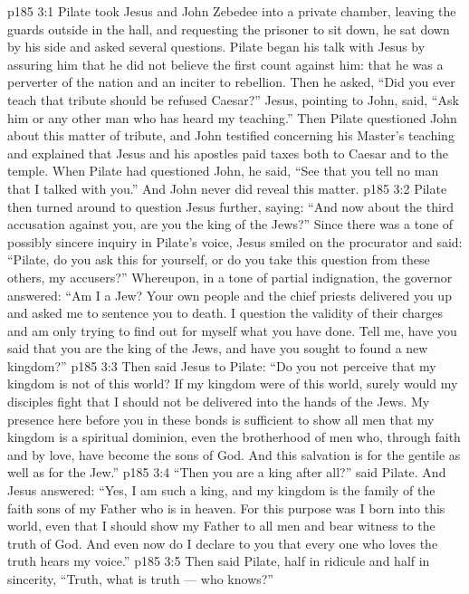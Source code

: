 \vs p185 3:1 Pilate took Jesus and John Zebedee into a private chamber, leaving the guards outside in the hall, and requesting the prisoner to sit down, he sat down by his side and asked several questions. Pilate began his talk with Jesus by assuring him that he did not believe the first count against him: that he was a perverter of the nation and an inciter to rebellion. Then he asked, “Did you ever teach that tribute should be refused Caesar?” Jesus, pointing to John, said, \textcolor{ubdarkred}{“Ask him or any other man who has heard my teaching.”} Then Pilate questioned John about this matter of tribute, and John testified concerning his Master’s teaching and explained that Jesus and his apostles paid taxes both to Caesar and to the temple. When Pilate had questioned John, he said, “See that you tell no man that I talked with you.” And John never did reveal this matter.
\vs p185 3:2 Pilate then turned around to question Jesus further, saying: “And now about the third accusation against you, are you the king of the Jews?” Since there was a tone of possibly sincere inquiry in Pilate’s voice, Jesus smiled on the procurator and said: \textcolor{ubdarkred}{“Pilate, do you ask this for yourself, or do you take this question from these others, my accusers?”} Whereupon, in a tone of partial indignation, the governor answered: “Am I a Jew? Your own people and the chief priests delivered you up and asked me to sentence you to death. I question the validity of their charges and am only trying to find out for myself what you have done. Tell me, have you said that you are the king of the Jews, and have you sought to found a new kingdom?”
\vs p185 3:3 Then said Jesus to Pilate: \textcolor{ubdarkred}{“Do you not perceive that my kingdom is not of this world? If my kingdom were of this world, surely would my disciples fight that I should not be delivered into the hands of the Jews. My presence here before you in these bonds is sufficient to show all men that my kingdom is a spiritual dominion, even the brotherhood of men who, through faith and by love, have become the sons of God. And this salvation is for the gentile as well as for the Jew.”}
\vs p185 3:4 “Then you are a king after all?” said Pilate. And Jesus answered: \textcolor{ubdarkred}{“Yes, I am such a king, and my kingdom is the family of the faith sons of my Father who is in heaven. For this purpose was I born into this world, even that I should show my Father to all men and bear witness to the truth of God. And even now do I declare to you that every one who loves the truth hears my voice.”}
\vs p185 3:5 Then said Pilate, half in ridicule and half in sincerity, “Truth, what is truth --- who knows?”
